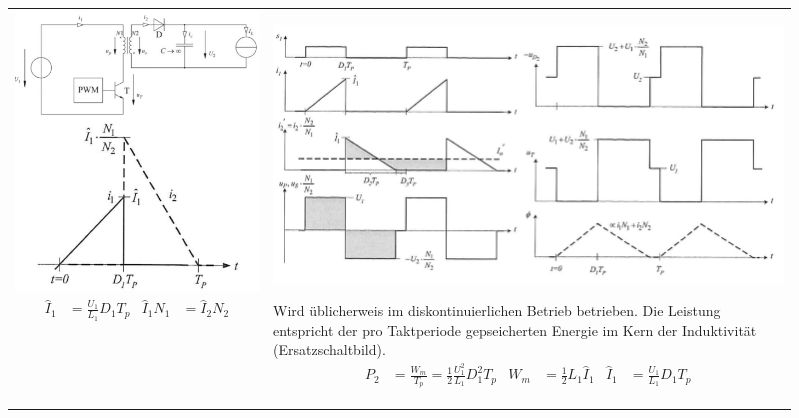 \documentclass[10pt,landscape]{scrartcl}
\begin{document}
\begin{multicols}{2}
\begin{tabular}{b{0.30\linewidth} b{0.61\linewidth}}
  \includegraphics[width=1.0\linewidth]{img/flyback/sch.png}%
  {\begin{align*}
    \hat{I}_1 &= \frac{U_1}{L_1}D_1T_p & \hat{I}_1N_1 &= \hat{I}_2N_2
  \end{align*}}
  &
  \includegraphics[width=\linewidth]{img/flyback/g1g2.png}%

  Wird üblicherweis im diskontinuierlichen Betrieb betrieben. Die Leistung entspricht der pro Taktperiode gepseicherten Energie im Kern der Induktivität (Ersatzschaltbild).
  {\begin{align*}
    P_2 &= \frac{W_m}{T_p} = \frac{1}{2}\frac{U_1^2}{L_1}D_1^2T_p &
    W_m &= \frac{1}{2}L_1\hat{I}_1 &
    \hat{I}_1 &= \frac{U_1}{L_1}D_1T_p
  \end{align*}}


\end{tabular}
\end{multicols}
\end{document}
